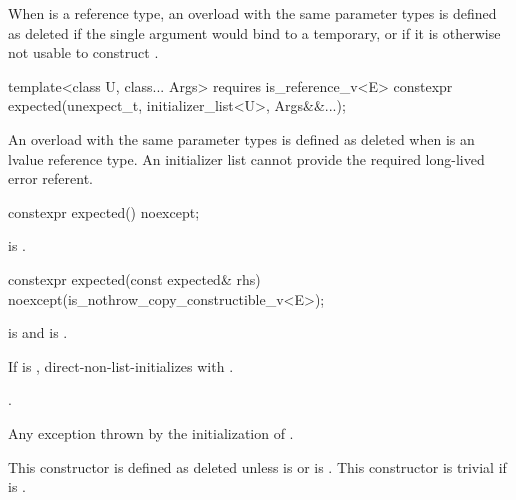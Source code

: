 \begin{itemdescr}
\pnum
\remarks
When  is a reference type, an overload with the same parameter types is defined as deleted if the single argument would bind  to a temporary, or if it is otherwise not usable to construct .
\end{itemdescr}

%
\begin{itemdecl}
template<class U, class... Args>
  requires is_reference_v<E>
constexpr expected(unexpect_t, initializer_list<U>, Args&&...);
\end{itemdecl}

\begin{itemdescr}
\pnum
\remarks
An overload with the same parameter types is defined as deleted when  is an lvalue reference type. An initializer list cannot provide the required long-lived error referent.
\end{itemdescr}

%
\begin{itemdecl}
constexpr expected() noexcept;
\end{itemdecl}

\begin{itemdescr}
\pnum
\ensures
{} is .
\end{itemdescr}

%
\begin{itemdecl}
constexpr expected(const expected& rhs) noexcept(is_nothrow_copy_constructible_v<E>);
\end{itemdecl}

\begin{itemdescr}
\pnum
\constraints
{} is  and  is .

\pnum
\effects
If  is , direct-non-list-initializes  with .

\pnum
\ensures
{}.

\pnum
\throws
Any exception thrown by the initialization of .

\pnum
\remarks
This constructor is defined as deleted unless  is  or  is . This constructor is trivial if  is .
\end{itemdescr}

